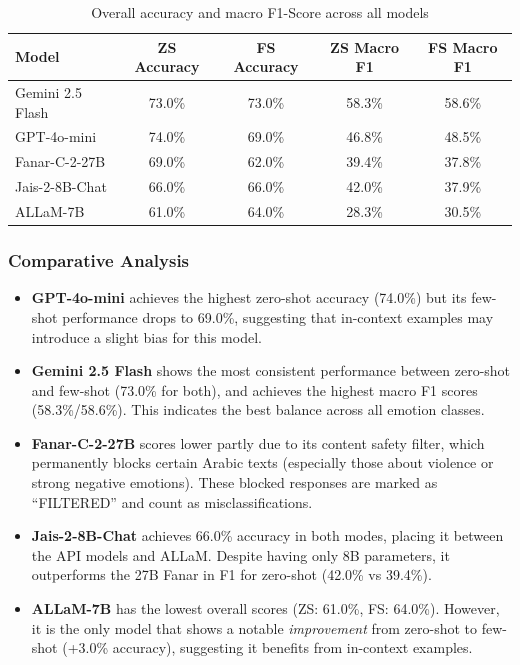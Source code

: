 \begin{table}[H]
    \centering
    \caption{Overall accuracy and macro F1-Score across all models}
    \label{tab:results_summary}
    \begin{tabular}{|l|c|c|c|c|}
        \hline
        \textbf{Model} & \textbf{ZS Accuracy} & \textbf{FS Accuracy} & \textbf{ZS Macro F1} & \textbf{FS Macro F1} \\
        \hline
        Gemini 2.5 Flash & 73.0\% & 73.0\% & 58.3\% & 58.6\% \\
        GPT-4o-mini & 74.0\% & 69.0\% & 46.8\% & 48.5\% \\
        Fanar-C-2-27B & 69.0\% & 62.0\% & 39.4\% & 37.8\% \\
        Jais-2-8B-Chat & 66.0\% & 66.0\% & 42.0\% & 37.9\% \\
        ALLaM-7B & 61.0\% & 64.0\% & 28.3\% & 30.5\% \\
        \hline
    \end{tabular}
\end{table}

\subsubsection{Comparative Analysis}

\begin{itemize}
    \item \textbf{GPT-4o-mini} achieves the highest zero-shot accuracy (74.0\%) but its few-shot performance drops to 69.0\%, suggesting that in-context examples may introduce a slight bias for this model.

    \item \textbf{Gemini 2.5 Flash} shows the most consistent performance between zero-shot and few-shot (73.0\% for both), and achieves the highest macro F1 scores (58.3\%/58.6\%). This indicates the best balance across all emotion classes.

    \item \textbf{Fanar-C-2-27B} scores lower partly due to its content safety filter, which permanently blocks certain Arabic texts (especially those about violence or strong negative emotions). These blocked responses are marked as ``FILTERED'' and count as misclassifications.

    \item \textbf{Jais-2-8B-Chat} achieves 66.0\% accuracy in both modes, placing it between the API models and ALLaM. Despite having only 8B parameters, it outperforms the 27B Fanar in F1 for zero-shot (42.0\% vs 39.4\%).

    \item \textbf{ALLaM-7B} has the lowest overall scores (ZS: 61.0\%, FS: 64.0\%). However, it is the only model that shows a notable \textit{improvement} from zero-shot to few-shot (+3.0\% accuracy), suggesting it benefits from in-context examples.
\end{itemize}

